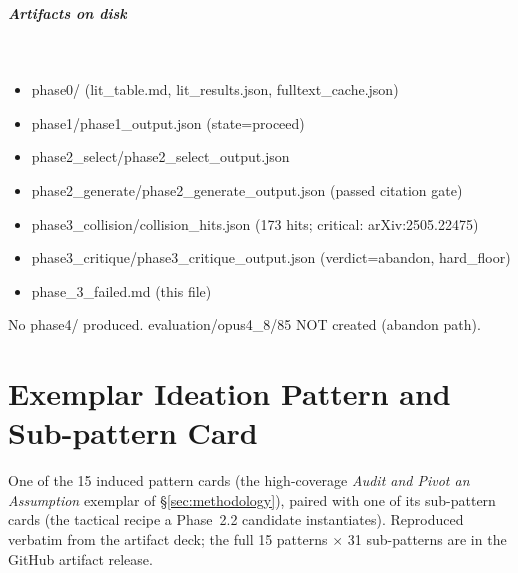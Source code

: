 \subparagraph{\textbf{Artifacts on disk}}\
\begin{itemize}[leftmargin=*]
\item phase0/ (lit\_table.md, lit\_results.json, fulltext\_cache.json)
\item phase1/phase1\_output.json (state=proceed)
\item phase2\_select/phase2\_select\_output.json
\item phase2\_generate/phase2\_generate\_output.json (passed citation gate)
\item phase3\_collision/collision\_hits.json (173 hits; critical: arXiv:2505.22475)
\item phase3\_critique/phase3\_critique\_output.json (verdict=abandon, hard\_floor)
\item phase\_3\_failed.md (this file)
\end{itemize}

No phase4/ produced. evaluation/opus4\_8/85 NOT created (abandon path).

\endgroup

\section{Exemplar Ideation Pattern and Sub-pattern Card}
\label{app:example-cards}
One of the 15 induced pattern cards (the high-coverage \emph{Audit and Pivot an Assumption} exemplar of
\S\ref{sec:methodology}), paired with one of its sub-pattern cards (the tactical recipe a Phase~2.2
candidate instantiates). Reproduced verbatim from the artifact deck; the full 15 patterns $\times$ 31
sub-patterns are in the GitHub artifact release.

